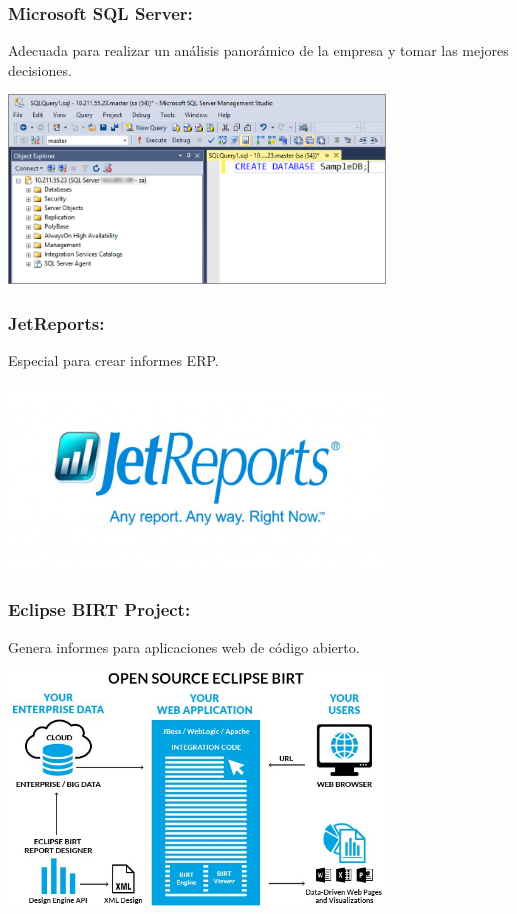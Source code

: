 \subsubsection{Microsoft SQL Server: }\label{sec:nada2}  
Adecuada para realizar un análisis panorámico de la empresa y tomar las mejores decisiones.
	\begin{center}
	\includegraphics[width=10cm]{./Imagenes/BIimagen8}
	\end{center}
	
\subsubsection{JetReports: }\label{sec:nada2}  
Especial para crear informes ERP.
	\begin{center}
	\includegraphics[width=10cm]{./Imagenes/BIimagen9}
	\end{center}
	
\subsubsection{Eclipse BIRT Project: }\label{sec:nada2}  
Genera informes para aplicaciones web de código abierto.
	\begin{center}
	\includegraphics[width=10cm]{./Imagenes/BIimagen10}
	\end{center}
	
